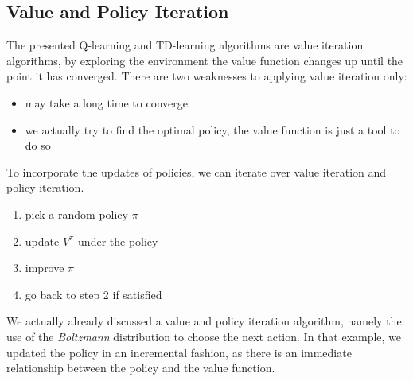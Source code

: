 \subsection{Value and Policy Iteration}
\label{subsec:iter}
The presented Q-learning and TD-learning algorithms are value iteration algorithms, by exploring the environment the value function changes up until the point it has converged. There are two weaknesses to applying value iteration only:
\begin{itemize}
\item may take a long time to converge
\item we actually try to find the optimal policy, the value function is just a tool to do so
\end{itemize}
To incorporate the updates of policies, we can iterate over value iteration and policy iteration.
\begin{enumerate}
\item pick a random policy $\pi$
\item update $V^{\pi}$ under the policy
\item improve $\pi$
\item go back to step 2 if satisfied
\end{enumerate}
We actually already discussed a value and policy iteration algorithm, namely the use of the \textit{Boltzmann} distribution to choose the next action. In that example, we updated the policy in an incremental fashion, as there is an immediate relationship between the policy and the value function.
